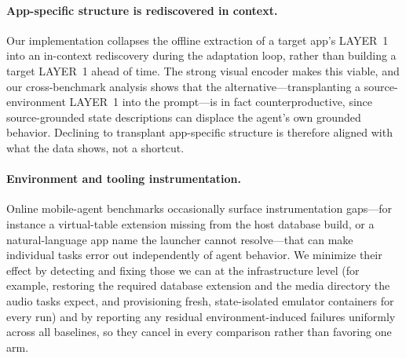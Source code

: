 \paragraph{App-specific structure is rediscovered in context.}
Our implementation collapses the offline extraction of a target app's LAYER~1
into an in-context rediscovery during the adaptation loop, rather than building a
target LAYER~1 ahead of time. The strong visual encoder makes this viable, and
our cross-benchmark analysis shows that the alternative---transplanting a
source-environment LAYER~1 into the prompt---is in fact counterproductive, since
source-grounded state descriptions can displace the agent's own grounded
behavior. Declining to transplant app-specific structure is therefore aligned
with what the data shows, not a shortcut.

\paragraph{Environment and tooling instrumentation.}
Online mobile-agent benchmarks occasionally surface instrumentation gaps---for
instance a virtual-table extension missing from the host database build, or a
natural-language app name the launcher cannot resolve---that can make individual
tasks error out independently of agent behavior. We minimize their effect by
detecting and fixing those we can at the infrastructure level (for example,
restoring the required database extension and the media directory the audio tasks
expect, and provisioning fresh, state-isolated emulator containers for every run)
and by reporting any residual environment-induced failures uniformly across all
baselines, so they cancel in every comparison rather than favoring one arm.
